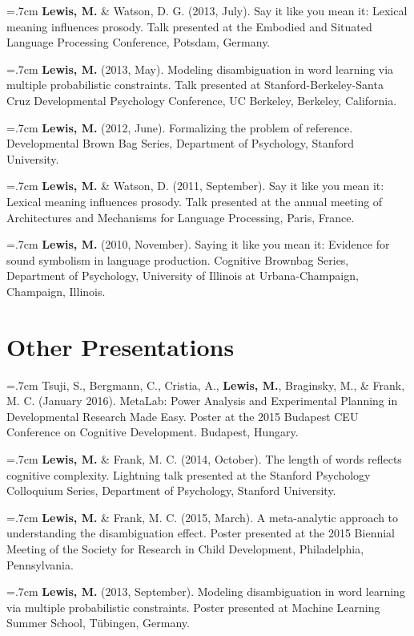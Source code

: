 \documentclass[letterpaper]{article}
\begin{document}
  \hangindent=.7cm {\bf Lewis, M.} \& Watson, D. G.  (2013, July). Say it like you mean it: Lexical meaning influences prosody. Talk presented at the Embodied and Situated Language Processing Conference, Potsdam, Germany.
 
 \hangindent=.7cm {\bf Lewis, M.} (2013, May). Modeling disambiguation in word learning via multiple probabilistic constraints. Talk presented at Stanford-Berkeley-Santa Cruz Developmental Psychology Conference, UC Berkeley, Berkeley, California.

\hangindent=.7cm {\bf Lewis, M.} (2012, June). Formalizing the problem of reference. Developmental Brown Bag Series, Department of Psychology, Stanford University.

 \hangindent=.7cm {\bf Lewis, M.}  \& Watson, D. (2011, September). Say it like you mean it: Lexical meaning influences prosody. Talk presented at the annual meeting of Architectures and Mechanisms for Language Processing, Paris, France.

\hangindent=.7cm {\bf Lewis, M.} (2010, November). Saying it like you mean it: Evidence for sound symbolism in language production. Cognitive Brownbag Series, Department of Psychology, University of Illinois at Urbana-Champaign, Champaign, Illinois. 

\section*{Other Presentations}

\hangindent=.7cm  Tsuji, S., Bergmann, C., Cristia, A., {\bf Lewis, M.}, Braginsky, M., \& Frank, M. C. (January 2016). MetaLab: Power Analysis and Experimental Planning in Developmental Research Made Easy. Poster at the 2015 Budapest CEU Conference on Cognitive
Development. Budapest, Hungary.

\hangindent=.7cm {\bf Lewis, M.} \& Frank, M. C. (2014, October). The length of words reflects cognitive complexity. Lightning talk presented at the Stanford Psychology Colloquium Series, Department of Psychology, Stanford University.

\hangindent=.7cm {\bf Lewis, M.} \& Frank, M. C. (2015, March). A meta-analytic approach to understanding the disambiguation effect. Poster presented at  the 2015 Biennial Meeting of the Society for Research in Child Development, Philadelphia, Pennsylvania.

 \hangindent=.7cm {\bf Lewis, M.} (2013, September). Modeling disambiguation in word learning via multiple probabilistic constraints. Poster presented at Machine Learning Summer School, T\"{u}bingen, Germany.
 
\end{document}
